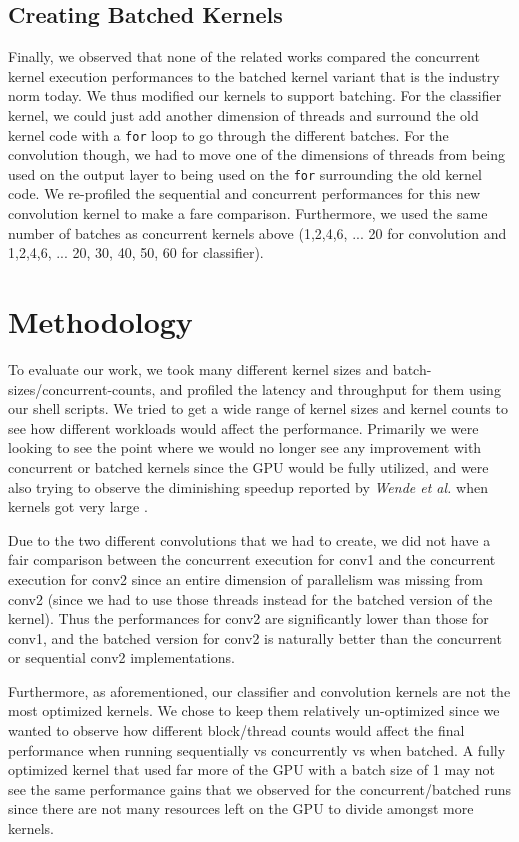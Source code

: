 \documentclass[sigconf]{acmart}
\begin{document}
\subsection{Creating Batched Kernels}
Finally, we observed that none of the related works compared the concurrent kernel execution performances to the batched kernel variant that is the industry norm today. We thus modified our kernels to support batching. For the classifier kernel, we could just add another dimension of threads and surround the old kernel code with a \lstinline{for} loop to go through the different batches. For the convolution though, we had to move one of the dimensions of threads from being used on the output layer to being used on the \lstinline{for} surrounding the old kernel code. We re-profiled the sequential and concurrent performances for this new convolution kernel to make a fare comparison. Furthermore, we used the same number of batches as concurrent kernels above (1,2,4,6, ... 20 for convolution and 1,2,4,6, ... 20, 30, 40, 50, 60 for classifier).

\section{Methodology}
To evaluate our work, we took many different kernel sizes and batch-sizes/concurrent-counts, and profiled the latency and throughput for them using our shell scripts. We tried to get a wide range of kernel sizes and kernel counts to see how different workloads would affect the performance. Primarily we were looking to see the point where we would no longer see any improvement with concurrent or batched kernels since the GPU would be fully utilized, and were also trying to observe the diminishing speedup reported by \textit{Wende et al.} when kernels got very large \cite{wende_cordes_steinke_2012}. 

Due to the two different convolutions that we had to create, we did not have a fair comparison between the concurrent execution for conv1 and the concurrent execution for conv2 since an entire dimension of parallelism was missing from conv2 (since we had to use those threads instead for the batched version of the kernel). Thus the performances for conv2 are significantly lower than those for conv1, and the batched version for conv2 is naturally better than the concurrent or sequential conv2 implementations.

Furthermore, as aforementioned, our classifier and convolution kernels are not the most optimized kernels. We chose to keep them relatively un-optimized since we wanted to observe how different block/thread counts would affect the final performance when running sequentially vs concurrently vs when batched. A fully optimized kernel that used far more of the GPU with a batch size of 1 may not see the same performance gains that we observed for the concurrent/batched runs since there are not many resources left on the GPU to divide amongst more kernels. 
\end{document}
